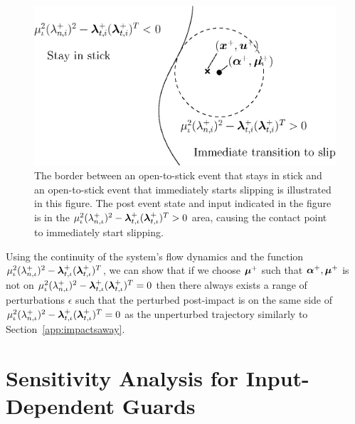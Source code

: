 \documentclass[../DC2017114Bouma.tex]{subfiles}
\begin{document}
\begin{figure}[h]
\centering
\includegraphics[width=.55\textwidth]{stickimmedslip.eps}\caption{The border between an open-to-stick event that stays in stick and an open-to-stick event that immediately starts slipping is illustrated in this figure. The post event state and input indicated in the figure is in the $\mu_{\iota}^2(\lambda^+_{n,\iota})^2 - \boldsymbol{\lambda}^+_{t,\iota}(\boldsymbol{\lambda}^+_{t,\iota})^T > 0$ area, causing the contact point to immediately start slipping.} \label{fig:stickimmedslip}
\end{figure}

Using the continuity of the system's flow dynamics and the function $\mu_{\iota}^2(\lambda^+_{n,\iota})^2 - \boldsymbol{\lambda}^+_{t,\iota}(\boldsymbol{\lambda}^+_{t,\iota})^T$, we can show that if we choose $\boldsymbol{\mu}^+$ such that $\boldsymbol{\alpha}^+,\boldsymbol{\mu}^+$ is not on $\mu_{\iota}^2(\lambda^+_{n,\iota})^2 - \boldsymbol{\lambda}^+_{t,\iota}(\boldsymbol{\lambda}^+_{t,\iota})^T = 0$ then there always exists a range of perturbations $\epsilon$ such that the perturbed post-impact is on the same side of $\mu_{\iota}^2(\lambda^+_{n,\iota})^2 - \boldsymbol{\lambda}^+_{t,\iota}(\boldsymbol{\lambda}^+_{t,\iota})^T = 0$ as the unperturbed trajectory similarly to Section~\ref{app:impactsaway}.

\pagestyle{fancyreport}
\cleartooddpage
\pagestyle{fancyreport}
\chapter{Sensitivity Analysis for Input-Dependent Guards}\label{app:Csensitivity}
\end{document}
